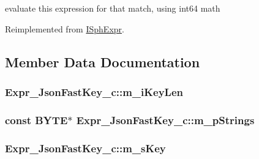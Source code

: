 evaluate this expression for that match, using int64 math 



Reimplemented from \hyperlink{structISphExpr_a4f14fae00cc5ebd877ce86419d4fed03}{I\-Sph\-Expr}.



\subsection{Member Data Documentation}
\hypertarget{structExpr__JsonFastKey__c_ab705124fa920ab1497a339a0f8229a7e}{
\subsubsection[{m\-\_\-i\-Key\-Len}]{ Expr\-\_\-\-Json\-Fast\-Key\-\_\-c\-::m\-\_\-i\-Key\-Len\hspace{0.3cm}{\ttfamily [protected]}}}\label{structExpr__JsonFastKey__c_ab705124fa920ab1497a339a0f8229a7e}
\hypertarget{structExpr__JsonFastKey__c_a78d8bd9aaf6078ba758f2ad39f843e35}{
\subsubsection[{m\-\_\-p\-Strings}]{\setlength{\rightskip}{0pt plus 5cm}const {\bf B\-Y\-T\-E}$\ast$ Expr\-\_\-\-Json\-Fast\-Key\-\_\-c\-::m\-\_\-p\-Strings\hspace{0.3cm}{\ttfamily [protected]}}}\label{structExpr__JsonFastKey__c_a78d8bd9aaf6078ba758f2ad39f843e35}
\hypertarget{structExpr__JsonFastKey__c_afa4afede36e85136fecc81ae83859195}{
\subsubsection[{m\-\_\-s\-Key}]{ Expr\-\_\-\-Json\-Fast\-Key\-\_\-c\-::m\-\_\-s\-Key\hspace{0.3cm}{\ttfamily [protected]}}}\label{structExpr__JsonFastKey__c_afa4afede36e85136fecc81ae83859195}
